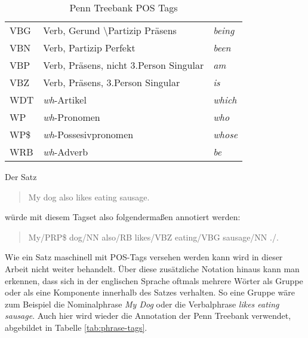 \begin{table}
\begin{tabular}{ | l l l |}
	VBG & Verb, Gerund \textbackslash Partizip Präsens & \textit{being} \\
	VBN & Verb, Partizip Perfekt & \textit{been} \\
	VBP & Verb, Präsens, nicht 3.Person Singular & \textit{am}  \\
	VBZ & Verb, Präsens, 3.Person Singular & \textit{is} \\
	WDT & \textit{wh}-Artikel & \textit{which} \\
	WP & \textit{wh}-Pronomen & \textit{who} \\
	WP\$ & \textit{wh}-Possesivpronomen & \textit{whose} \\
	WRB & \textit{wh}-Adverb & \textit{be} \\
	\hline
\end{tabular}
\caption{Penn Treebank POS Tags} %
\label{tab:pos-tags}
\end{table}
Der Satz
\begin{quote}
My dog also likes eating sausage.
\end{quote}
würde mit diesem Tagset also folgendermaßen annotiert werden:
\begin{quote}
My/PRP\$ dog/NN also/RB likes/VBZ eating/VBG sausage/NN ./.
\end{quote}
Wie ein Satz maschinell mit POS-Tags versehen werden kann wird in dieser Arbeit nicht weiter behandelt. 
Über diese zusätzliche Notation hinaus kann man erkennen, dass sich in der englischen Sprache oftmals mehrere Wörter als Gruppe oder als eine Komponente innerhalb des Satzes verhalten. So eine Gruppe wäre zum Beispiel die Nominalphrase \textit{My Dog} oder die Verbalphrase \textit{likes eating sausage}. Auch hier wird wieder die Annotation der Penn Treebank verwendet, abgebildet in Tabelle \ref{tab:phrase-tags}.
